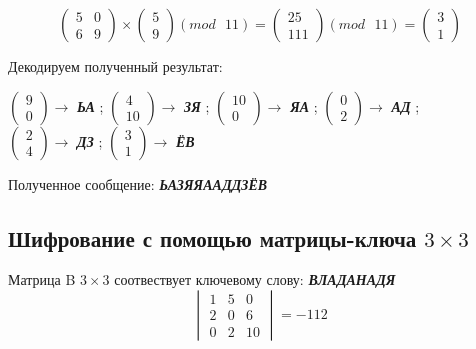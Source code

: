 \documentclass[a5paper, 10pt]{article}
\theoremstyle{definition}
\theoremstyle{plain}
\theoremstyle{remark}
\begin{document}
\begin{equation}
\begin{pmatrix}
 5 & 0\\
 6 & 9
\end{pmatrix}
 \times
\begin{pmatrix}
 5\\
9
\end{pmatrix}
(mod \text{ }11)
= 
\begin{pmatrix}
 25\\
111
\end{pmatrix}
(mod \text{ }11)
= \begin{pmatrix}
 3\\
1
\end{pmatrix}
\end{equation}

Декодируем полученный результат:
\begin{center}
 $ \begin{pmatrix}
 9\\
0
\end{pmatrix} \to$ \textbf{\textit{ЬА}} ;
 $ \begin{pmatrix}
 4\\
10
\end{pmatrix} \to$ \textbf{\textit{ЗЯ}} ;
 $ \begin{pmatrix}
 10\\
0
\end{pmatrix} \to$ \textbf{\textit{ЯА}} ;
 $ \begin{pmatrix}
 0\\
2
\end{pmatrix} \to$ \textbf{\textit{АД}} ; \\
 $ \begin{pmatrix}
 2\\
4
\end{pmatrix} \to$ \textbf{\textit{ДЗ}} ;
$\begin{pmatrix}
 3\\
1
\end{pmatrix} \to$ \textbf{\textit{ЁВ}}  \\
\end{center}
Полученное сообщение:  \textbf{\textit{ЬАЗЯЯААДДЗЁВ}}


\subsection{Шифрование с помощью матрицы-ключа $3 \times 3$}
Матрица B $3 \times 3$ соотвествует ключевому слову: \textbf{\textit{ВЛАДАНАДЯ}}
\begin{equation}
\begin{vmatrix}
 1 & 5 & 0\\
 2 & 0 & 6 \\
 0 & 2 & 10
\end{vmatrix}
 = -112
\end{equation}
\end{document}

